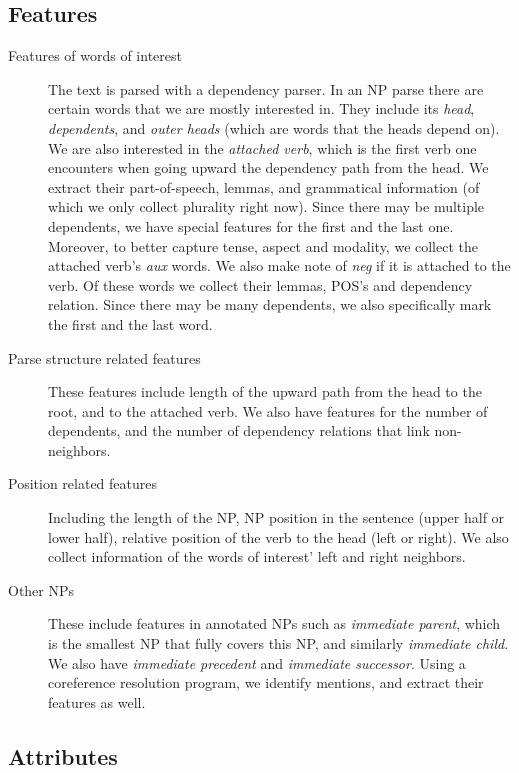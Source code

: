 \documentclass[11pt,letterpaper]{article}
\newcommand{\ensuretext}[1]{#1}
\newcommand{\nssmarker}{\ensuretext{\textcolor{magenta}{\ensuremath{^{\textsc{NS}}_{\textsc{S}}}}}}
\newcommand{\arkcomment}[3]{\ensuretext{\textcolor{#3}{[#1 #2]}}}
\newcommand{\nss}[1]{\arkcomment{\nssmarker}{#1}{magenta}}
\begin{document}
\subsection{Features}\label{sec:feats}
\begin{description}
	\item[Features of words of interest] The text is parsed with a dependency parser. In an NP parse there are certain words that we are mostly interested in. They include its \emph{head},
    \emph{dependents}, and \emph{outer heads} (which are words that the heads depend on). We are also interested in the \emph{attached verb}, which is the first verb one encounters when going upward the dependency path from the head. We extract their part-of-speech,
    lemmas, and grammatical information (of which we only collect plurality right now). Since there may be multiple dependents,
    we have special features for the first and the last one. Moreover, to better capture tense, aspect and modality, we collect the attached verb's \emph{aux} words. We also make note of \emph{neg} if it is attached to the verb.
    Of these words we collect their lemmas, POS's and dependency relation. Since there may be many dependents, we also specifically mark the first and the last word.
    
    \item[Parse structure related features] These features include length of the upward path from the head to the root, and to the attached verb. We also have features for the number of dependents, and the number of dependency relations that link non-neighbors.
    \item[Position related features] Including the length of the NP, NP position in the sentence (upper half or lower half), relative position of the verb to the head (left or right). We also collect information of the words of interest' left and right neighbors.
    \item[Other NPs] These include features in annotated NPs such as \emph{immediate parent}, which is the smallest NP that fully covers this NP, and similarly \emph{immediate child}. We also have \emph{immediate precedent} and \emph{immediate successor}. Using a coreference resolution program, we identify mentions, and extract their features as well.
    
\end{description}


\subsection{Attributes}\label{sec:attrs}
\end{document}

